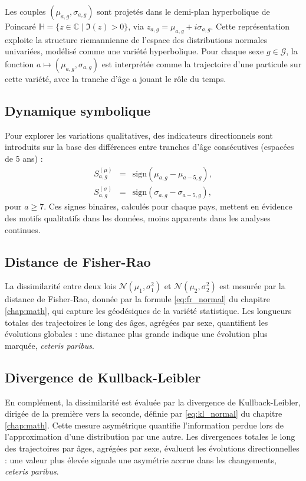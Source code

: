 Les couples $(\mu_{a,g}, \sigma_{a,g})$ sont projetés dans le demi-plan hyperbolique de Poincaré $\mathbb{H} = \{ z \in \mathbb{C} \mid \Im(z) > 0 \}$, via $z_{a,g} = \mu_{a,g} + i \sigma_{a,g}$. Cette représentation exploite la structure riemannienne de l'espace des distributions normales univariées, modélisé comme une variété hyperbolique. Pour chaque sexe $g \in \mathcal{G}$, la fonction $a \mapsto (\mu_{a,g}, \sigma_{a,g})$ est interprétée comme la trajectoire d'une particule sur cette variété, avec la tranche d'âge $a$ jouant le rôle du temps.

\subsection{Dynamique symbolique}

Pour explorer les variations qualitatives, des indicateurs directionnels sont introduits sur la base des différences entre tranches d'âge consécutives (espacées de 5 ans) :
\begin{eqnarray}
	S_{a,g}^{(\mu)} &=& \mathrm{sign}(\mu_{a,g} - \mu_{a-5,g}), \\
	S_{a,g}^{(\sigma)} &=& \mathrm{sign}(\sigma_{a,g} - \sigma_{a-5,g}),
\end{eqnarray}
pour $a \geq 7$. Ces signes binaires, calculés pour chaque pays, mettent en évidence des motifs qualitatifs dans les données, moins apparents dans les analyses continues.

\subsection{Distance de Fisher-Rao}

La dissimilarité entre deux lois $\mathcal{N}(\mu_1, \sigma_1^2)$ et $\mathcal{N}(\mu_2, \sigma_2^2)$ est mesurée par la distance de Fisher-Rao, donnée par la formule \eqref{eq:fr_normal} du chapitre \ref{chap:math}, qui capture les géodésiques de la variété statistique. Les longueurs totales des trajectoires le long des âges, agrégées par sexe, quantifient les évolutions globales : une distance plus grande indique une évolution plus marquée, \emph{ceteris paribus}.

\subsection{Divergence de Kullback-Leibler}

En complément, la dissimilarité est évaluée par la divergence de Kullback-Leibler, dirigée de la première vers la seconde, définie par \eqref{eq:kl_normal} du chapitre \ref{chap:math}. Cette mesure asymétrique quantifie l'information perdue lors de l'approximation d'une distribution par une autre. Les divergences totales le long des trajectoires par âges, agrégées par sexe, évaluent les évolutions directionnelles : une valeur plus élevée signale une asymétrie accrue dans les changements, \emph{ceteris paribus}.

